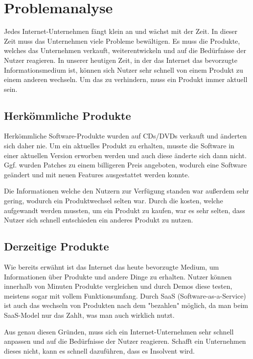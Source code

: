 \chapter{Problemanalyse}
\label{chap:analyse}
Jedes Internet-Unternehmen fängt klein an und wächst mit der Zeit. In dieser Zeit muss das Unternehmen viele Probleme bewältigen. Es muss die Produkte, welches das Unternehmen verkauft, weiterentwickeln und auf die Bedürfnisse der Nutzer reagieren. In unserer heutigen Zeit, in der das Internet das bevorzugte Informationsmedium ist, können sich Nutzer sehr schnell von einem Produkt zu einem anderen wechseln. Um das zu verhindern, muss ein Produkt immer aktuell sein.

\section{Herkömmliche Produkte}
\label{sec:herkömmlicheProdukte}
Herkömmliche Software-Produkte wurden auf CDs/DVDs verkauft und änderten sich daher nie. Um ein aktuelles Produkt zu erhalten, musste die Software in einer aktuellen Version erworben werden und auch diese änderte sich dann nicht. Ggf. wurden Patches zu einem billigeren Preis angeboten, wodurch eine Software geändert und mit neuen Features ausgestattet werden konnte.

Die Informationen welche den Nutzern zur Verfügung standen war außerdem sehr gering, wodurch ein Produktwechsel selten war. Durch die kosten, welche aufgewandt werden mussten, um ein Produkt zu kaufen, war es sehr selten, dass Nutzer sich schnell entschieden ein anderes Produkt zu nutzen.

\section{Derzeitige Produkte}
\label{sec:derzeitigeProdukte}
Wie bereits erwähnt ist das Internet das heute bevorzugte Medium, um Informationen über Produkte und andere Dinge zu erhalten. Nutzer können innerhalb von Minuten Produkte vergleichen und durch Demos diese testen, meistens sogar mit vollem Funktionsumfang. Durch SaaS (Software-as-a-Service) ist auch das wechseln von Produkten nach dem "bezahlen" möglich, da man beim SaaS-Model nur das Zahlt, was man auch wirklich nutzt.

Aus genau diesen Gründen, muss sich ein Internet-Unternehmen sehr schnell anpassen und auf die Bedürfnisse der Nutzer reagieren. Schafft ein Unternehmen dieses nicht, kann es schnell dazuführen, dass es Insolvent wird.


